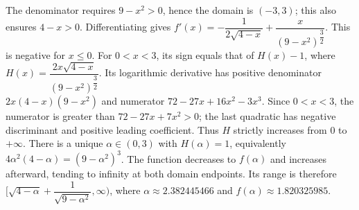 The denominator requires $9-x^2>0$, hence the domain is $\boxed{(-3,3)}$; this also ensures $4-x>0$. Differentiating gives $f'(x)=-\dfrac{1}{2\sqrt{4-x}}+\dfrac{x}{(9-x^2)^{\dfrac{3}{2}}}$. This is negative for $x\le0$. For $0<x<3$, its sign equals that of $H(x)-1$, where $H(x)=\dfrac{2x\sqrt{4-x}}{(9-x^2)^{\dfrac{3}{2}}}$. Its logarithmic derivative has positive denominator $2x(4-x)(9-x^2)$ and numerator $72-27x+16x^2-3x^3$. Since $0<x<3$, the numerator is greater than $72-27x+7x^2>0$; the last quadratic has negative discriminant and positive leading coefficient. Thus $H$ strictly increases from $0$ to $+\infty$. There is a unique $\alpha\in(0,3)$ with $H(\alpha)=1$, equivalently $4\alpha^2(4-\alpha)=(9-\alpha^2)^3$. The function decreases to $f(\alpha)$ and increases afterward, tending to infinity at both domain endpoints. Its range is therefore $\boxed{[\sqrt{4-\alpha}+\dfrac{1}{\sqrt{9-\alpha^2}},\infty)}$, where $\alpha\approx2.382445466$ and $f(\alpha)\approx1.820325985$.
